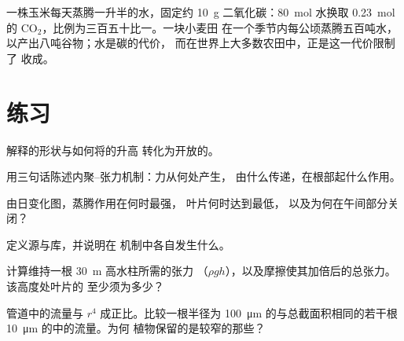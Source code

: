 \begin{example}[数字中的交易]\label{ex:b1:plant-transport:bargain}
一株玉米每天蒸腾一升半的水，固定约
\qty{10}{g} 二氧化碳：\qty{80}{mol} 水换取
\qty{0.23}{mol} 的 $\mathrm{CO_2}$，比例为三百五十比一。一块小麦田
在一个季节内每公顷蒸腾五百吨水，
以产出八吨谷物；水是碳的代价，
而在世界上大多数农田中，正是这一代价限制了
收成。
\end{example}

\section{练习}

\begin{exercise}[$\star$]\label{exo:b1:plant-transport:1}
解释的形状与如何将的升高
转化为开放的。
\end{exercise}

\begin{exercise}[$\star$]\label{exo:b1:plant-transport:2}
用三句话陈述内聚–张力机制：力从何处产生，
由什么传递，在根部起什么作用。
\end{exercise}

\begin{exercise}[$\star$]\label{exo:b1:plant-transport:3}
由日变化图，蒸腾作用在何时最强，
叶片何时达到最低，
以及为何在午间部分关闭？
\end{exercise}

\begin{exercise}[$\star$]\label{exo:b1:plant-transport:4}
定义源与库，并说明在
机制中各自发生什么。
\end{exercise}

\begin{exercise}[$\star\star$]\label{exo:b1:plant-transport:5}
计算维持一根 \qty{30}{m} 高水柱所需的张力
（$\rho g h$），以及摩擦使其加倍后的总张力。该高度处叶片的
至少须为多少？
\end{exercise}

\begin{exercise}[$\star\star$]\label{exo:b1:plant-transport:6}
管道中的流量与 $r^4$ 成正比。比较一根半径为
\qty{100}{\micro m} 的与总截面积相同的若干根
\qty{10}{\micro m} 的中的流量。为何
植物保留的是较窄的那些？
\end{exercise}

